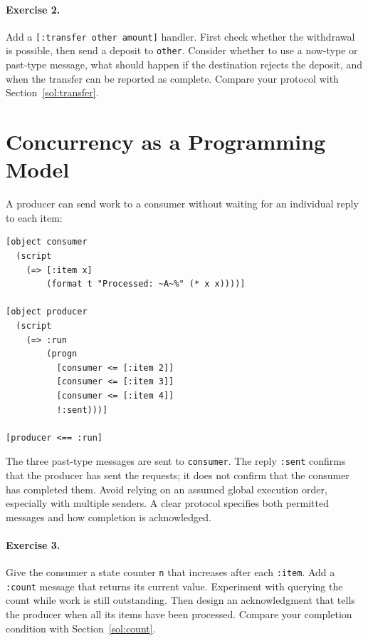 \documentclass[11pt,a4paper]{article}
\newcommand{\code}[1]{\texttt{#1}}
\newenvironment{codeblock}{%
  \par\addvspace{\medskipamount}\noindent
  \begin{minipage}{\linewidth}%
  \vspace*{\medskipamount}%
  \lstset{aboveskip=0pt,belowskip=0pt}%
}{%
  \end{minipage}\par\addvspace{\medskipamount}}
\begin{document}
\paragraph{Exercise 2.}
Add a \code{[:transfer other amount]} handler. First check whether the
withdrawal is possible, then send a deposit to \code{other}.
Consider whether to use a now-type or past-type message, what should
happen if the destination rejects the deposit, and when the transfer
can be reported as complete.
Compare your protocol with Section~\ref{sol:transfer}.

\section{Concurrency as a Programming Model}

A producer can send work to a consumer without waiting for an individual
reply to each item:

\begin{codeblock}
\begin{lstlisting}
[object consumer
  (script
    (=> [:item x]
        (format t "Processed: ~A~%" (* x x))))]

[object producer
  (script
    (=> :run
        (progn
          [consumer <= [:item 2]]
          [consumer <= [:item 3]]
          [consumer <= [:item 4]]
          !:sent)))]

[producer <== :run]
\end{lstlisting}
\end{codeblock}

The three past-type messages are sent to \code{consumer}.
The reply \code{:sent} confirms that the producer has sent the requests;
it does not confirm that the consumer has completed them.
Avoid relying on an assumed global execution order, especially with
multiple senders. A clear protocol specifies both permitted messages
and how completion is acknowledged.

\paragraph{Exercise 3.}
Give the consumer a state counter \code{n} that increases after each
\code{:item}. Add a \code{:count} message that returns its current value.
Experiment with querying the count while work is still outstanding.
Then design an acknowledgment that tells the producer when all its
items have been processed.
Compare your completion condition with Section~\ref{sol:count}.
\end{document}
